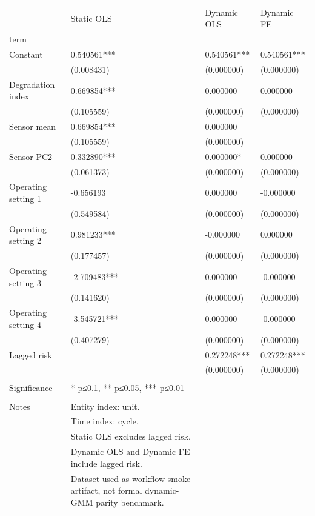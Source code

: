 \begin{tabular}{llll}
\toprule
 & Static OLS & Dynamic OLS & Dynamic FE \\
term &  &  &  \\
\midrule
Constant & 0.540561*** & 0.540561*** & 0.540561*** \\
 & (0.008431) & (0.000000) & (0.000000) \\
Degradation index & 0.669854*** & 0.000000 & 0.000000 \\
 & (0.105559) & (0.000000) & (0.000000) \\
Sensor mean & 0.669854*** & 0.000000 &  \\
 & (0.105559) & (0.000000) &  \\
Sensor PC2 & 0.332890*** & 0.000000* & 0.000000 \\
 & (0.061373) & (0.000000) & (0.000000) \\
Operating setting 1 & -0.656193 & 0.000000 & -0.000000 \\
 & (0.549584) & (0.000000) & (0.000000) \\
Operating setting 2 & 0.981233*** & -0.000000 & 0.000000 \\
 & (0.177457) & (0.000000) & (0.000000) \\
Operating setting 3 & -2.709483*** & 0.000000 & -0.000000 \\
 & (0.141620) & (0.000000) & (0.000000) \\
Operating setting 4 & -3.545721*** & 0.000000 & -0.000000 \\
 & (0.407279) & (0.000000) & (0.000000) \\
Lagged risk &  & 0.272248*** & 0.272248*** \\
 &  & (0.000000) & (0.000000) \\
 &  &  &  \\
Significance & * p≤0.1, ** p≤0.05, *** p≤0.01 &  &  \\
 &  &  &  \\
Notes & Entity index: unit. &  &  \\
 & Time index: cycle. &  &  \\
 & Static OLS excludes lagged risk. &  &  \\
 & Dynamic OLS and Dynamic FE include lagged risk. &  &  \\
 & Dataset used as workflow smoke artifact, not formal dynamic-GMM parity benchmark. &  &  \\
\bottomrule
\end{tabular}
